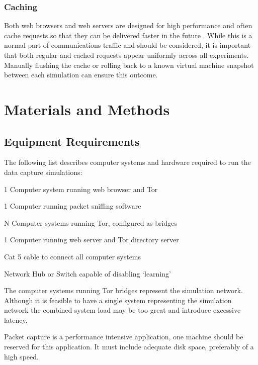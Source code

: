 \documentclass{ecuthesis}
\begin{document}
\subsection{Caching}

Both web browsers and web servers are designed for high performance and often
cache requests so that they can be delivered faster in the future
\parencite{Caceres:1998p7419}. While this is a normal part of communications
traffic and should be considered, it is important that both regular and cached
requests appear uniformly across all experiments. Manually flushing the cache
or rolling back to a known virtual machine snapshot between each simulation can
ensure this outcome.

\chapter{Materials and Methods}

\section{Equipment Requirements}

The following list describes computer systems and hardware required to run the
data capture simulations:

\begin{itemize*}
  \item 1 Computer system running web browser and Tor
  \item 1 Computer running packet sniffing software
  \item N Computer systems running Tor, configured as bridges
  \item 1 Computer running web server and Tor directory server
  \item Cat 5 cable to connect all computer systems
  \item Network Hub or Switch capable of disabling ‘learning’
    \parencite{website:hub-reference}
\end{itemize*}

The computer systems running Tor bridges represent the simulation network.
Although it is feasible to have a single system representing the simulation
network the combined system load may be too great and introduce  excessive
latency.

Packet capture is a performance intensive application, one machine should be
reserved for this application. It must include adequate disk space, preferably
of a high speed.
\end{document}
